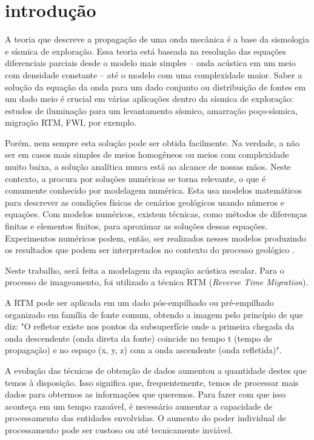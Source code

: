 \chapter{introdução}
\label{cap1}

A teoria que descreve a propagação de uma onda mecânica é a base da 
sismologia e sísmica de exploração. Essa teoria está 
baseada na resolução das equações diferenciais parciais desde o modelo mais simples –
onda acústica em um meio com densidade constante – até o modelo com uma complexidade
maior. Saber a solução da equação da onda para um dado conjunto ou distribuição de
fontes em um dado meio é crucial em várias aplicações dentro da sísmica de 
exploração: estudos de iluminação para um levantamento sísmico, amarração 
poço-sísmica, migração RTM, FWI, por exemplo.

Porém, nem sempre esta solução pode ser obtida facilmente. Na verdade, a não ser 
em casos mais simples de meios homogêneos ou meios com complexidade muito baixa, 
a solução analítica nunca está ao alcance de nossas mãos. Neste contexto, a 
procura por soluções numéricas se torna relevante, o que é comumente conhecido 
por modelagem numérica. Esta usa modelos matemáticos para descrever as condições 
físicas de cenários geológicos usando números e equações. Com modelos numéricos, 
existem técnicas, como métodos de diferenças finitas e elementos finitos, para 
aproximar as soluções dessas equações. Experimentos numéricos podem, então, ser 
realizados nesses modelos produzindo os resultados que podem ser interpretados 
no contexto do processo geológico \citep{ismail2010computational}.

Neste trabalho, será feita a modelagem da equação acústica escalar. Para o processo de imageamento, foi utilizado a técnica RTM (\textit{Reverse Time Migration}).

A RTM pode ser aplicada em um dado
pós-empilhado ou pré-empilhado organizado em família de
fonte comum, obtendo a imagem pelo princípio de \citep{claerbout1971toward} que diz: "O refletor
existe nos pontos da subsuperfície onde a primeira chegada da onda descendente (onda
direta da fonte) coincide no tempo t (tempo de propagação) e no espaço (x, y, z) com a
onda ascendente (onda refletida)".

A evolução das técnicas de obtenção de dados aumentou a quantidade destes que temos à disposição. Isso significa que, frequentemente, temos de processar mais dados para obtermos as informações que queremos. Para fazer com que isso aconteça em um tempo razoável, é necessário aumentar a capacidade de processamento das entidades envolvidas. O aumento do poder individual de processamento pode ser custoso ou até tecnicamente inviável. 

